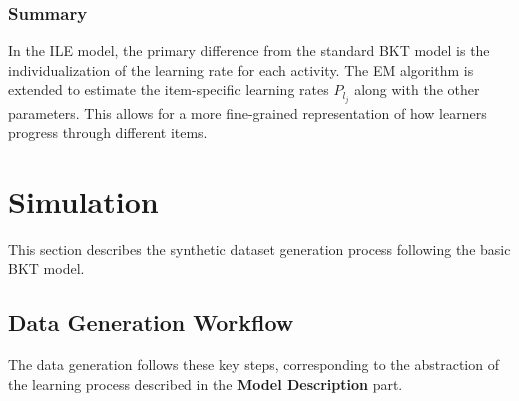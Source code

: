 \documentclass{article}
\begin{document}
\subsubsection{Summary}
In the ILE model, the primary difference from the standard BKT model is the individualization of the learning rate for each activity. The EM algorithm is extended to estimate the item-specific learning rates \(P_{l_j}\) along with the other parameters. This allows for a more fine-grained representation of how learners progress through different items.


\section{Simulation}

This section describes the synthetic dataset generation process following the basic BKT model.

\subsection{Data Generation Workflow}
The data generation follows these key steps, corresponding to the abstraction of the learning process described in the \textbf{Model Description} part.
\end{document}
